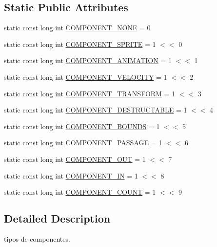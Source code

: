 \subsection*{Static Public Attributes}
\begin{DoxyCompactItemize}
\item 
static const long int \hyperlink{class_components_mask_a65df1295d217a6d29d7221447fe06da5}{C\+O\+M\+P\+O\+N\+E\+N\+T\+\_\+\+N\+O\+N\+E} = 0
\item 
static const long int \hyperlink{class_components_mask_ab05302f9381801724a58273ff83ad2a6}{C\+O\+M\+P\+O\+N\+E\+N\+T\+\_\+\+S\+P\+R\+I\+T\+E} = 1 $<$$<$ 0
\item 
static const long int \hyperlink{class_components_mask_ab32c9febcb2a0d312b03b41f777a23c2}{C\+O\+M\+P\+O\+N\+E\+N\+T\+\_\+\+A\+N\+I\+M\+A\+T\+I\+O\+N} = 1 $<$$<$ 1
\item 
static const long int \hyperlink{class_components_mask_ac7fff00913ea1c8b225c90b02ecd3243}{C\+O\+M\+P\+O\+N\+E\+N\+T\+\_\+\+V\+E\+L\+O\+C\+I\+T\+Y} = 1 $<$$<$ 2
\item 
static const long int \hyperlink{class_components_mask_a3a66579e45c351c13abe63e61f2eaa0a}{C\+O\+M\+P\+O\+N\+E\+N\+T\+\_\+\+T\+R\+A\+N\+S\+F\+O\+R\+M} = 1 $<$$<$ 3
\item 
static const long int \hyperlink{class_components_mask_af9ec785367e18857389d34be89269879}{C\+O\+M\+P\+O\+N\+E\+N\+T\+\_\+\+D\+E\+S\+T\+R\+U\+C\+T\+A\+B\+L\+E} = 1 $<$$<$ 4
\item 
static const long int \hyperlink{class_components_mask_a81ccaf0bf7344c970bc8474df2625ba7}{C\+O\+M\+P\+O\+N\+E\+N\+T\+\_\+\+B\+O\+U\+N\+D\+S} = 1 $<$$<$ 5
\item 
static const long int \hyperlink{class_components_mask_a9686a00bbefcd13f5fab9780446733c1}{C\+O\+M\+P\+O\+N\+E\+N\+T\+\_\+\+P\+A\+S\+S\+A\+G\+E} = 1 $<$$<$ 6
\item 
static const long int \hyperlink{class_components_mask_ab28458934af33cdf7d3c8e128c4da866}{C\+O\+M\+P\+O\+N\+E\+N\+T\+\_\+\+O\+U\+T} = 1 $<$$<$ 7
\item 
static const long int \hyperlink{class_components_mask_a6a8d73981d65f39acb16bbeeced5a95b}{C\+O\+M\+P\+O\+N\+E\+N\+T\+\_\+\+I\+N} = 1 $<$$<$ 8
\item 
static const long int \hyperlink{class_components_mask_a7a90217e6d5da07c838e12fe2f355448}{C\+O\+M\+P\+O\+N\+E\+N\+T\+\_\+\+C\+O\+U\+N\+T} = 1 $<$$<$ 9
\end{DoxyCompactItemize}


\subsection{Detailed Description}
tipos de componentes. 

